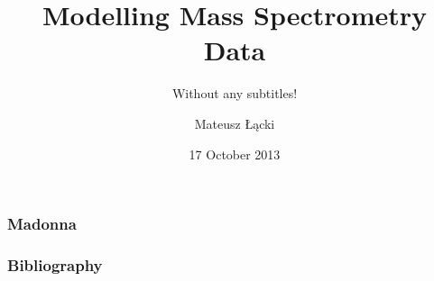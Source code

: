 \documentclass[xetex]{beamer}
\title[Mass Spectrometry]{Modelling Mass Spectrometry Data}
\subtitle{Without any subtitles!}
\date{17 October 2013}
\author[Matteo]{Mateusz Łącki}
\institute[UW]{Uniwersytet Warszawski}
\begin{document}

			
	\begin{frame}[t]\frametitle{Madonna}
		    
		
	\end{frame}	

	\begin{frame}[t]\frametitle{Bibliography}
		
		
	\end{frame}



\end{document}
